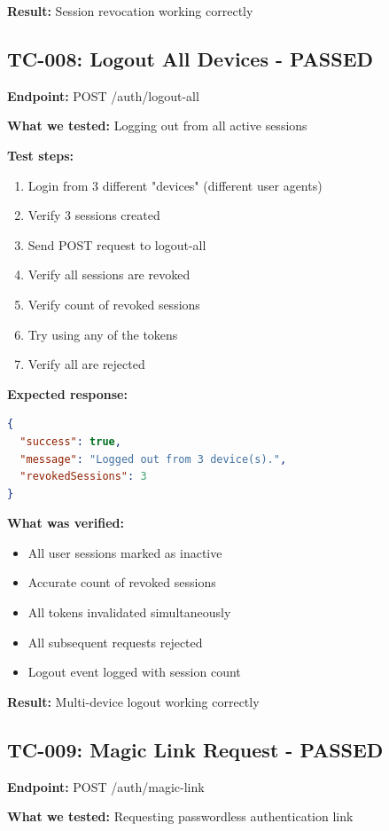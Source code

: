 \documentclass[11pt,a4paper]{article}
\begin{document}
\textbf{Result:} Session revocation working correctly

\subsection{TC-008: Logout All Devices - PASSED}
\textbf{Endpoint:} POST /auth/logout-all

\textbf{What we tested:} Logging out from all active sessions

\textbf{Test steps:}
\begin{enumerate}
    \item Login from 3 different "devices" (different user agents)
    \item Verify 3 sessions created
    \item Send POST request to logout-all
    \item Verify all sessions are revoked
    \item Verify count of revoked sessions
    \item Try using any of the tokens
    \item Verify all are rejected
\end{enumerate}

\textbf{Expected response:}
\begin{lstlisting}[language=json]
{
  "success": true,
  "message": "Logged out from 3 device(s).",
  "revokedSessions": 3
}
\end{lstlisting}

\textbf{What was verified:}
\begin{itemize}
    \item All user sessions marked as inactive
    \item Accurate count of revoked sessions
    \item All tokens invalidated simultaneously
    \item All subsequent requests rejected
    \item Logout event logged with session count
\end{itemize}

\textbf{Result:} Multi-device logout working correctly

\subsection{TC-009: Magic Link Request - PASSED}
\textbf{Endpoint:} POST /auth/magic-link

\textbf{What we tested:} Requesting passwordless authentication link
\end{document}
